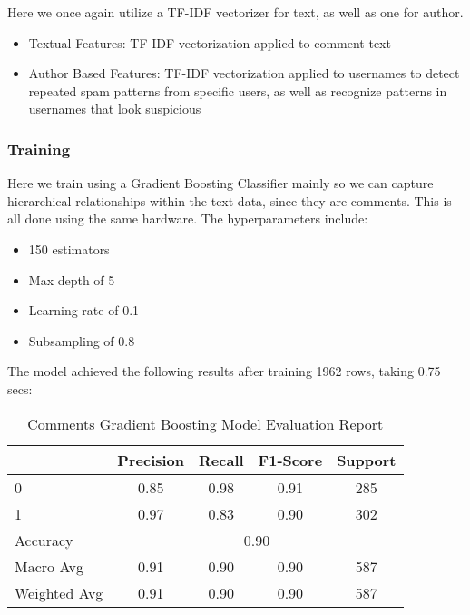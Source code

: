 \documentclass{article}
\begin{document}
Here we once again utilize a TF-IDF vectorizer for text, as well as one for author.

\begin{itemize}
    \item Textual Features: TF-IDF vectorization applied to comment text
    \item Author Based Features: TF-IDF vectorization applied to usernames to detect repeated spam patterns from specific users, as well as recognize patterns in usernames that look suspicious
\end{itemize}

\subsubsection*{Training}

Here we train using a Gradient Boosting Classifier mainly so we can capture hierarchical relationships within the text data, since they are comments. This is all done using the same hardware. The hyperparameters include:

\begin{itemize}
    \item 150 estimators
    \item Max depth of 5
    \item Learning rate of 0.1
    \item Subsampling of 0.8
\end{itemize}

The model achieved the following results after training 1962 rows, taking 0.75 secs:

\begin{table}[htbp]
    \centering
    \caption{Comments Gradient Boosting Model Evaluation Report}
    \begin{tabular}{l c c c c}
    \toprule
     & Precision & Recall & F1-Score & Support \\
    \midrule
    0 & 0.85 & 0.98 & 0.91 & 285 \\
    1 & 0.97 & 0.83 & 0.90 & 302 \\
    \midrule
    Accuracy & \multicolumn{4}{c}{0.90} \\
    Macro Avg & 0.91 & 0.90 & 0.90 & 587 \\
    Weighted Avg & 0.91 & 0.90 & 0.90 & 587 \\
    \bottomrule
    \end{tabular}
    \label{tab:gradient_boosting_evaluation}
\end{table}
\end{document}
